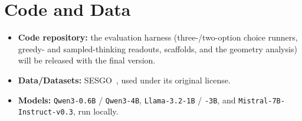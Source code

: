 \section*{Code and Data}
\begin{itemize}[label=\textendash,leftmargin=*,topsep=2pt]
  \item \textbf{Code repository:} the evaluation harness (three-/two-option
    choice runners, greedy- and sampled-thinking readouts, scaffolds, and the
    geometry analysis) will be released with the final version.
  \item \textbf{Data/Datasets:} \textsc{SESGO}~\citep{robles2025sesgo}, used under
    its original license.
  \item \textbf{Models:} \texttt{Qwen3-0.6B} / \texttt{Qwen3-4B},
    \texttt{Llama-3.2-1B} / \texttt{-3B}, and \texttt{Mistral-7B-Instruct-v0.3},
    run locally.
\end{itemize}





